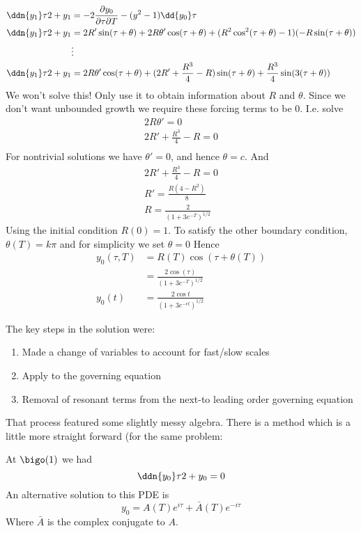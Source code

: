 \documentclass{/home/janmebows/Documents/LatexTemplates/myassignment}
\begin{document}
\begin{align*}
        \ddn{y_1}\tau2 + y_1 &= - 2\frac{\partial y_0}{\partial \tau \partial T} - (y^2-1)\dd{y_0}\tau\\
        \ddn{y_1}\tau2 + y_1 &=  2R'\sin(\tau+\theta) + 2R\theta'\cos(\tau+\theta) +(R^2\cos^2(\tau+\theta)-1)(-R\sin(\tau+\theta))\\
        &\vdots\\
        \ddn{y_1}\tau2 + y_1 &=  2R\theta'\cos(\tau+\theta) + (2R' + \frac{R^3}{4} - R) \sin(\tau +\theta) + \frac{R^3}{4} \sin(3(\tau+\theta))
\end{align*}
We won't solve this! Only use it to obtain information about $R$ and $\theta$.
Since we don't want unbounded growth we require these forcing terms to be $0$. I.e. solve
\begin{align*}
    2R\theta' =0\\
    2R' + \frac{R^3}{4} - R = 0\\
\end{align*}
For nontrivial solutions we have $\theta' =0$, and hence $\theta = c$. And 
\begin{align*}
    2R' + \frac{R^3}{4} - R = 0\\
    R' = \frac{R(4-R^2)}{8}\\ 
    R = \frac{2}{(1+3e^{-T})^{1/2}}
\end{align*}
Using the initial condition $R(0)=1$.
To satisfy the other boundary condition, $\theta(T) = k\pi$ and for simplicity we set $\theta =0 $
Hence
\begin{align*}
    y_0(\tau,T) &= R(T) \cos(\tau + \theta(T))\\
    &= \frac{2\cos(\tau)}{(1+3e^{-T})^{1/2}}\\
    y_0(t)&= \frac{2\cos t}{(1+3e^{-\epsilon t})^{1/2}}
\end{align*}

The key steps in the solution were:
\begin{enumerate}
    \item Made a change of variables to account for fast/slow scales
    \item Apply to the governing equation
    \item Removal of resonant terms from the next-to leading order governing equation
\end{enumerate}
That process featured some slightly messy algebra. There is a method which is a little more straight forward (for the same problem:


At $\bigo(1)$ we had
\[\ddn{y_0}\tau 2 + y_0 = 0\]
An alternative solution to this PDE is
\[y_0 = A(T) e^{i\tau} + \bar{A}(T)e^{-i\tau}\]
Where $\bar{A}$ is the complex conjugate to $A$.
\end{document}
